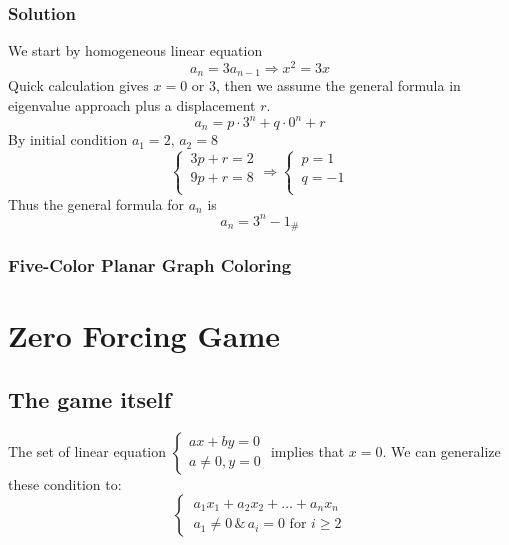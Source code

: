 \documentclass[11pt]{article}
\begin{document}
\subsubsection*{Solution}
We start by  homogeneous linear equation
\[
    a_n=3a_{n-1}\Rightarrow x^2=3x
\]
Quick calculation gives $\displaystyle x=0 \text{ or }3$, then we assume the general formula in eigenvalue approach plus a displacement $r$.
\[
    a_n=p\cdot 3^n + q\cdot 0^n + r
\]
By initial condition $a_1 = 2,\, a_2 = 8$
\[
    \begin{cases}
        \displaystyle
        \,3p+r=2\\
        \displaystyle
        \,9p+r=8\\
    \end{cases}
    \Rightarrow
    \begin{cases}
        \displaystyle
        \,p=1\\
        \displaystyle
        \,q=-1\\
    \end{cases}
\]
Thus the general formula for $a_n$ is 
\[
    a_n = 3^n - 1 _\#
\]
\subsubsection{Five-Color Planar Graph Coloring}




\section{Zero Forcing Game}
\subsection{The game itself}
The set of linear equation 
$\begin{cases}
    ax+by=0\\
    a\neq 0, y= 0
\end{cases}$ implies that $x=0$. We can generalize these condition to: 
\[
    \begin{cases}
        \displaystyle
        \,a_1x_1+a_2x_2+\dots+a_nx_n\\
        \displaystyle
        \,a_1 \neq 0 \, \& \, a_i = 0 \text{ for } i \geq 2
    \end{cases}
\]
\end{document}
